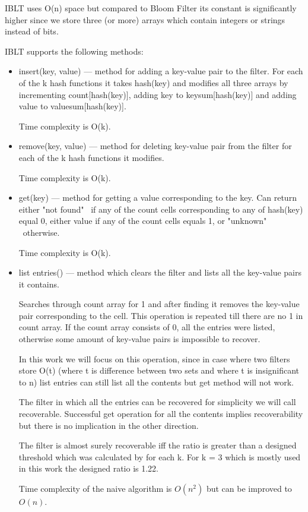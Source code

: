 \documentclass{article}
\begin{document}
IBLT uses O(n) space but compared to Bloom Filter its constant is significantly 
higher since we store three (or more) arrays which contain integers or strings 
instead of bits.

IBLT supports the following methods:
\begin{itemize}
    \item insert(key, value) --- method for adding a key-value pair to the filter.
        For each of the k hash functions it takes hash(key) and modifies all 
        three arrays by incrementing count[hash(key)], adding key to 
        keysum[hash(key)] and adding value to valuesum[hash(key)]. 

        Time complexity is O(k).
    \item remove(key, value) --- method for deleting key-value pair from the
        filter for each of the k hash functions it modifies.

        Time complexity is O(k).
    \item get(key) --- method for getting a value corresponding to the key.
        Can return either "not found" \  if any of the count cells corresponding
        to any of hash(key) equal 0, either value if any of the count cells 
        equals 1, or "unknown" \ otherwise.

        Time complexity is O(k).
    \item list entries() --- method which clears the filter and lists all the 
        key-value pairs it contains.

        Searches through count array for 1 and after finding it removes the
        key-value pair corresponding to the cell. This operation is repeated till
        there are no 1 in count array. If the count array consists of 0, all the
        entries were listed, otherwise some amount of key-value pairs is 
        impossible to recover.

        In this work we will focus on this operation, since in case where two
        filters store O(t) (where t is difference between two sets and where t
        is insignificant to n) list entries can still list all the contents but 
        get method will not work.

        The filter in which all the entries can be recovered for simplicity we 
        will call recoverable. Successful get operation for all the contents 
        implies recoverability but there is no implication in the other direction.
        

        The filter is almost surely recoverable iff the ratio is greater than 
        a designed threshold which was calculated by \textcite{GoMi2011} for each
        k. For k = 3 which is mostly used in this work the designed ratio is 1.22.

        Time complexity of the naive algorithm is $O(n^2)$ but can
        be improved to $O(n)$.
\end{itemize}
\end{document}
